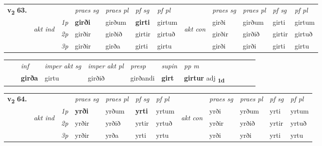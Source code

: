 \begin{tabular}{llllllllllll} \toprule
\multirow{4}{*}{{{\textbf{v{\textsubscript{2}}} \Large{\textbf{63.}}}}}  & &   &  \textit{praes sg}  & \textit{praes pl}  &\textit{ pf sg} & \textit{pf pl} &  &  \textit{praes sg}  & \textit{praes pl}  & \textit{pf sg} & \textit{pf pl } \\*
	\cmidrule{4-7} \cmidrule{9-12}
 & \multirow{3}{*}{\begin{turn}{90}\textit{akt ind}\end{turn}} & {\textit{1p}} & \textbf{girði} & girðum    & \textbf{girti} & girtum & \multirow{3}{*}{\begin{turn}{90}\textit{akt con}\end{turn}} &girði & girðum & girti & girtum\\*
& &  {\textit{2p}} &  girðir  & girðið   & girtir & girtuð & & girðir & girðið & girtir & girtuð \\*
& &  {\textit{3p}} & girðir & girða   & girti & girtu & & girði & girði& girti & girtu  \\*
\cmidrule{4-7} \cmidrule{9-12}
\end{tabular}


\begin{tabular}{llllllllllll}
 & & \textit{inf} & \textit{imper akt sg} & \textit{imper akt pl}   & \textit{presp} & \textit{supin}  & \textit{pp m}     \\*
  & & \textbf{girða} & girtu  & girðið   & girðandi &  \textbf{girt}  & \textbf{girtur} adj \textbf{\textsubscript{1d}} \\*
\cmidrule{1-12}
\end{tabular}



\begin{tabular}{llllllllllll} \toprule
\multirow{4}{*}{{{\textbf{v{\textsubscript{2}}} \Large{\textbf{64.}}}}}  & &   &  \textit{praes sg}  & \textit{praes pl}  &\textit{ pf sg} & \textit{pf pl} &  &  \textit{praes sg}  & \textit{praes pl}  & \textit{pf sg} & \textit{pf pl } \\*
	\cmidrule{4-7} \cmidrule{9-12}
 & \multirow{3}{*}{\begin{turn}{90}\textit{akt ind}\end{turn}} & {\textit{1p}} & \textbf{yrði} & yrðum    & \textbf{yrti} & yrtum & \multirow{3}{*}{\begin{turn}{90}\textit{akt con}\end{turn}} &yrði & yrðum & yrti & yrtum\\*
& &  {\textit{2p}} &  yrðir  & yrðið   & yrtir & yrtuð & & yrðir & yrðið & yrtir & yrtuð \\*
& &  {\textit{3p}} & yrðir & yrða   & yrti & yrtu & & yrði & yrði& yrti & yrtu  \\*
\cmidrule{4-7} \cmidrule{9-12}
\end{tabular}


